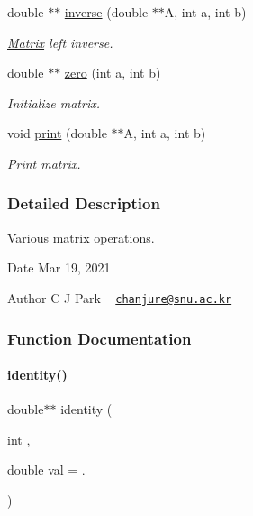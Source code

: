 \begin{DoxyCompactItemize}
double $\ast$$\ast$ \hyperlink{Matrix_8C_a19adaf60a005ffeb9071a395d0ee069f}{inverse} (double $\ast$$\ast$A, int a, int b)
\begin{DoxyCompactList}\small\item\em \hyperlink{classMatrix}{Matrix} left inverse. \end{DoxyCompactList}\item 
double $\ast$$\ast$ \hyperlink{Matrix_8C_ab8a4d647abae3e1b8dd318f1db696bc6}{zero} (int a, int b)
\begin{DoxyCompactList}\small\item\em Initialize matrix. \end{DoxyCompactList}\item 
void \hyperlink{Matrix_8C_a9c8e250ed43efa25186112ef66e4491f}{print} (double $\ast$$\ast$A, int a, int b)
\begin{DoxyCompactList}\small\item\em Print matrix. \end{DoxyCompactList}\end{DoxyCompactItemize}


\subsubsection{Detailed Description}
Various matrix operations. 

\begin{DoxyDate}{Date}
Mar 19, 2021 
\end{DoxyDate}
\begin{DoxyAuthor}{Author}
C J Park ~\newline
 \href{mailto:chanjure@snu.ac.kr}{\tt chanjure@snu.\+ac.\+kr} 
\end{DoxyAuthor}


\subsubsection{Function Documentation}
\mbox{\label{Matrix_8C_affa4629470e427c236e2a7ac925e4e73}} 
\paragraph{\texorpdfstring{identity()}{identity()}}
{\footnotesize\ttfamily double$\ast$$\ast$ identity (\begin{DoxyParamCaption}\item[{int}]{,  }\item[{double}]{val = {.} }\end{DoxyParamCaption})}




